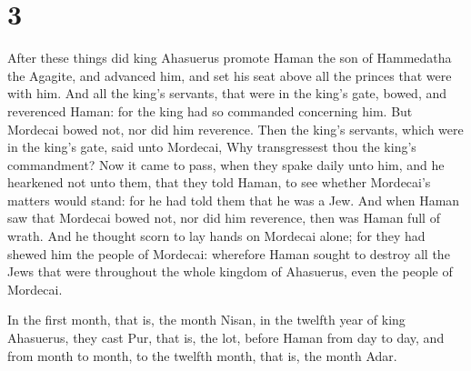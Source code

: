 \hypertarget{section-2}{%
\section{3}\label{section-2}}

 After these things did king Ahasuerus promote Haman the
son of Hammedatha the Agagite, and advanced him, and set his seat above
all the princes that were with him.  And all the king's
servants, that were in the king's gate, bowed, and reverenced Haman: for
the king had so commanded concerning him. But Mordecai bowed not, nor
did him reverence.  Then the king's servants, which were
in the king's gate, said unto Mordecai, Why transgressest thou the
king's commandment?  Now it came to pass, when they spake
daily unto him, and he hearkened not unto them, that they told Haman, to
see whether Mordecai's matters would stand: for he had told them that he
was a Jew.  And when Haman saw that Mordecai bowed not,
nor did him reverence, then was Haman full of wrath.  And
he thought scorn to lay hands on Mordecai alone; for they had shewed him
the people of Mordecai: wherefore Haman sought to destroy all the Jews
that were throughout the whole kingdom of Ahasuerus, even the people of
Mordecai.

 In the first month, that is, the month Nisan, in the
twelfth year of king Ahasuerus, they cast Pur, that is, the lot, before
Haman from day to day, and from month to month, to the twelfth month,
that is, the month Adar.

